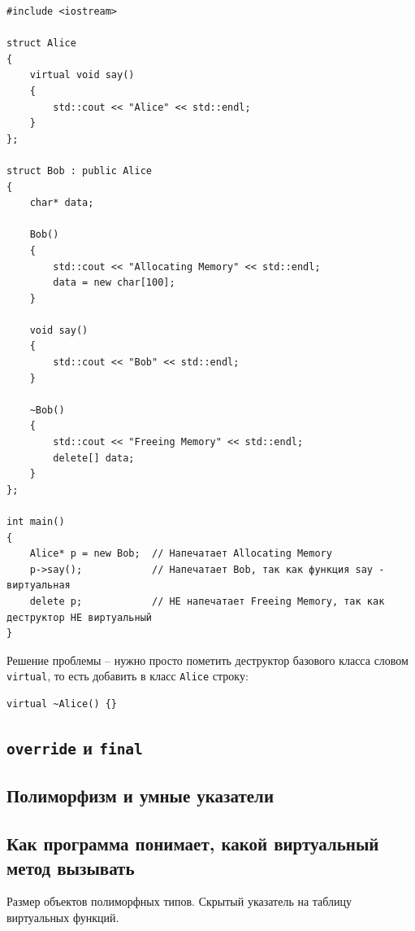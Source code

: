 \documentclass{article}
\begin{document}
\begin{lstlisting}[style=csMiptCppBorderStyle]
#include <iostream>

struct Alice 
{
    virtual void say() 
    {
    	std::cout << "Alice" << std::endl;
    }
};

struct Bob : public Alice 
{
	char* data;
	
	Bob()
	{
		std::cout << "Allocating Memory" << std::endl;
		data = new char[100];		
	}
	
    void say() 
    {
    	std::cout << "Bob" << std::endl;
    }
    
    ~Bob()
    {
    	std::cout << "Freeing Memory" << std::endl;
    	delete[] data;
    }
};

int main() 
{
	Alice* p = new Bob;  // Напечатает Allocating Memory
    p->say();            // Напечатает Bob, так как функция say - виртуальная
    delete p;            // НЕ напечатает Freeing Memory, так как деструктор НЕ виртуальный
}
\end{lstlisting}

Решение проблемы -- нужно просто пометить деструктор базового класса словом \texttt{virtual}, то есть добавить в класс \texttt{Alice} строку:
\begin{lstlisting}[style=csMiptCppStyle]
virtual ~Alice() {}
\end{lstlisting}

\subsection*{\texttt{override} и \texttt{final}}

\subsection*{Полиморфизм и умные указатели}

\subsection*{Как программа понимает, какой виртуальный метод вызывать}
Размер объектов полиморфных типов. Скрытый указатель на таблицу виртуальных функций.
\end{document}
